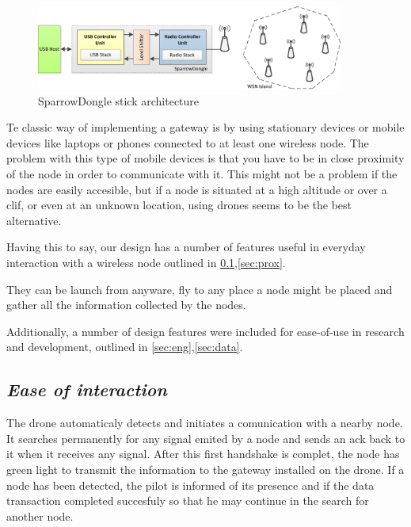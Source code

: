 \label{chap:arch}

\begin{figure}[ht] \centering
\includegraphics[width=0.9\textwidth]{img/Architecture.png}
\caption{SparrowDongle stick architecture} \end{figure}

Te classic way of implementing a gateway is by using stationary devices or mobile devices like laptops or phones connected to at least one wireless node. The problem with this type of mobile devices is that you have to be in close proximity of the node in order to communicate with it. This might not be a problem if the nodes are easily accesible, but if a node is situated at a high altitude or over a clif, or even at an unknown location, using drones seems to be the best alternative.

Having this to say, our design has a number of features useful in everyday interaction with a wireless node outlined in \ref{sec:inter},\ref{sec:prox}. 

They can be launch from anyware, fly to any place a node might be placed and gather all the information collected by the nodes.

Additionally, a number of design features were included for ease-of-use in
research and development, outlined in \ref{sec:eng},\ref{sec:data}.


\subsection{\textit{Ease of interaction}} 

\label{sec:inter}

The drone automaticaly detects and initiates a comunication with a nearby node. It searches permanently for any signal emited by a node and sends an ack back to it when it receives any signal. After this first handshake is complet, the node has green light to transmit the information to the gateway installed on the drone. If a node has been detected, the pilot is informed of its presence and if the data transaction completed succesfuly so that he may continue in the search for another node.

